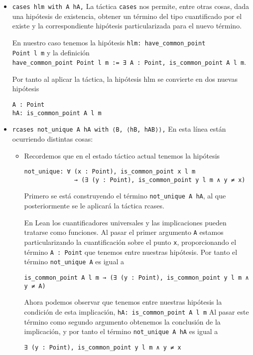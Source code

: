 \begin{itemize}
	\item \lstinline{cases hlm with A hA,} La táctica \lstinline{cases} nos
	      permite, entre otras cosas, dada una hipótesis de existencia, obtener un
	      término del tipo cuantificado por el existe y la correspondiente hipótesis
	      particularizada para el nuevo término.

	      En nuestro caso tenemos la hipótesis \lstinline{hlm: have_common_point
		      Point l m} y la definición \\
	      \lstinline{have_common_point Point l m := ∃ A : Point, is_common_point A l m}.

	      Por tanto al aplicar la táctica, la hipótesis hlm se convierte en dos
	      nuevas hipótesis
	      \begin{lstlisting}
A : Point 
hA: is_common_point A l m
      \end{lstlisting}

	\item \lstinline{rcases not_unique A hA with ⟨B, ⟨hB, hAB⟩⟩,} En esta línea
	      están ocurriendo distintas cosas:
	      \begin{itemize}
		      \item Recordemos que en el estado táctico actual tenemos la hipótesis
		            \begin{lstlisting}
not_unique: ∀ (x : Point), is_common_point x l m 
              → (∃ (y : Point), is_common_point y l m ∧ y ≠ x) 
            \end{lstlisting}

		            Primero se está construyendo el término \lstinline{not_unique A hA},
		            al que posteriormente se le aplicará la táctica {rcases}.

		            En Lean los cuantificadores universales y las implicaciones pueden
		            tratarse como funciones. Al pasar el primer argumento \lstinline{A}
		            estamos particularizando la cuantificación sobre el punto
		            \lstinline{x}, proporcionando el término \lstinline{A : Point} que
		            tenemos entre nuestras hipótesis. Por tanto el término
		            \lstinline{not_unique A} es igual a
		            \begin{lstlisting}
is_common_point A l m → (∃ (y : Point), is_common_point y l m ∧ y ≠ A)
            \end{lstlisting}

		            Ahora podemos observar que tenemos entre nuestras hipótesis la
		            condición de esta implicación, \lstinline{hA: is_common_point A l m}
		            Al pasar este término como segundo argumento obtenemos la conclusión
		            de la implicación, y por tanto el término
		            \lstinline{not_unique A hA} es igual a
		            \begin{lstlisting}
∃ (y : Point), is_common_point y l m ∧ y ≠ x
            \end{lstlisting}


\end{itemize}
\end{itemize}
